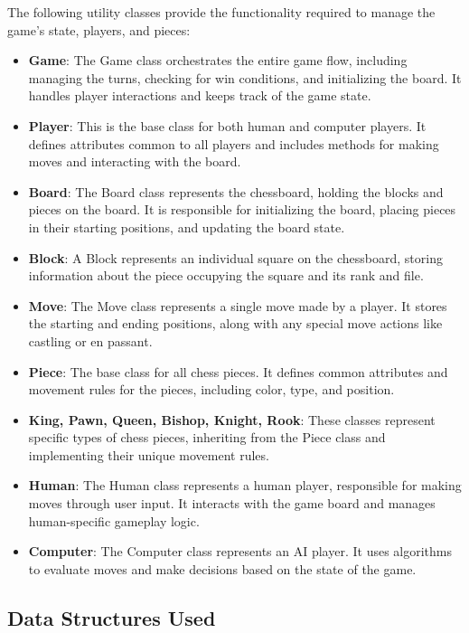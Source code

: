 \documentclass[a4paper,12pt]{article}
\begin{document}
The following utility classes provide the functionality required to manage the game's state, players, and pieces:

\begin{itemize}
    \item \textbf{Game}: The Game class orchestrates the entire game flow, including managing the turns, checking for win conditions, and initializing the board. It handles player interactions and keeps track of the game state.
    \item \textbf{Player}: This is the base class for both human and computer players. It defines attributes common to all players and includes methods for making moves and interacting with the board.
    \item \textbf{Board}: The Board class represents the chessboard, holding the blocks and pieces on the board. It is responsible for initializing the board, placing pieces in their starting positions, and updating the board state.
    \item \textbf{Block}: A Block represents an individual square on the chessboard, storing information about the piece occupying the square and its rank and file.
    \item \textbf{Move}: The Move class represents a single move made by a player. It stores the starting and ending positions, along with any special move actions like castling or en passant.
    \item \textbf{Piece}: The base class for all chess pieces. It defines common attributes and movement rules for the pieces, including color, type, and position.
    \item \textbf{King, Pawn, Queen, Bishop, Knight, Rook}: These classes represent specific types of chess pieces, inheriting from the Piece class and implementing their unique movement rules.
    \item \textbf{Human}: The Human class represents a human player, responsible for making moves through user input. It interacts with the game board and manages human-specific gameplay logic.
    \item \textbf{Computer}: The Computer class represents an AI player. It uses algorithms to evaluate moves and make decisions based on the state of the game.
\end{itemize}

\subsection{Data Structures Used}
\end{document}
